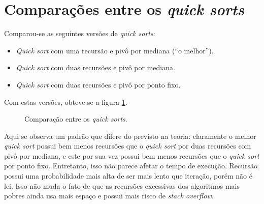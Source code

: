 \documentclass{article}[twocolumn]
\begin{document}
	\section{Compara\c{c}\~oes entre os \textit{quick sorts}}
	Comparou-se as seguintes vers\~oes de \textit{quick sorts}:
	\begin{itemize}
		\item \textit{Quick sort} com uma recurs\~ao e piv\^o por mediana (``o melhor'').
		\item \textit{Quick sort} com duas recurs\~oes e piv\^o por mediana.
		\item \textit{Quick sort} com duas recurs\~oes e piv\^o por ponto fixo.
	\end{itemize}
	Com estas vers\~oes, obteve-se a figura \ref{fig:quicks}.
	\begin{figure}[H]
		\centering
		\caption{Compara\c{c}\~ao entre os \textit{quick sorts}.}
		\label{fig:quicks}
	\end{figure}
	Aqui se observa um padr\~ao que difere do previsto na teoria: claramente o melhor
	\textit{quick sort} possui bem menos recurs\~oes que o \textit{quick sort} por duas
	recurs\~oes com piv\^o por mediana, e este por sua vez possui bem menos recurs\~oes
	que o \textit{quick sort} por ponto fixo. Entretanto, isso n\~ao parece afetar o tempo
	de execu\c{c}\~ao. Recurs\~ao possui uma probabilidade mais alta de ser mais lento
	que itera\c{c}\~ao, por\'em n\~ao \'e lei. Isso n\~ao muda o fato de que as recurs\~oes
	excessivas dos algoritmos mais pobres ainda usa mais espa\c{c}o e possui mais risco
	de \textit{stack overflow}.
\end{document}
